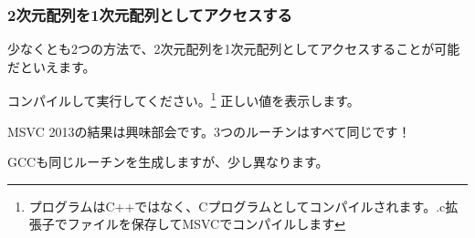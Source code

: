 ﻿\subsubsection{2次元配列を1次元配列としてアクセスする}

少なくとも2つの方法で、2次元配列を1次元配列としてアクセスすることが可能だといえます。



コンパイルして実行してください。\footnote{プログラムはC++ではなく、Cプログラムとしてコンパイルされます。.c拡張子でファイルを保存してMSVCでコンパイルします}
正しい値を表示します。

MSVC 2013の結果は興味部会です。3つのルーチンはすべて同じです！



GCCも同じルーチンを生成しますが、少し異なります。



